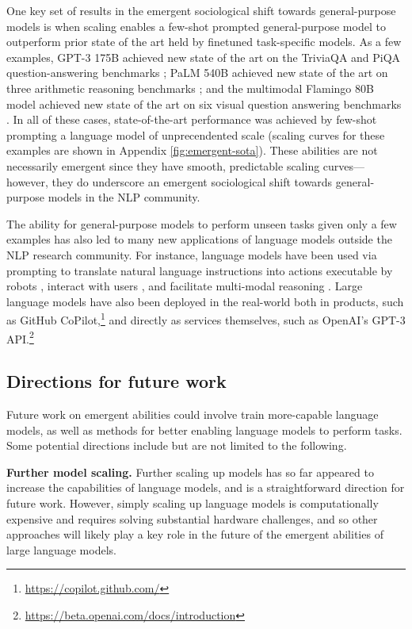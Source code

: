 \documentclass[10pt]{article} %
\begin{document}
One key set of results in the emergent sociological shift towards general-purpose models is when scaling enables a few-shot prompted general-purpose model to outperform prior state of the art held by finetuned task-specific models.
As a few examples, GPT-3 175B achieved new state of the art on the TriviaQA and PiQA question-answering benchmarks \citep{brown2020language}; PaLM 540B achieved new state of the art on three arithmetic reasoning benchmarks \citep{chowdhery2022palm}; and the multimodal Flamingo 80B model achieved new state of the art on six visual question answering benchmarks \citep{alayrac2022flamingo}.
In all of these cases, state-of-the-art performance was achieved by few-shot prompting a language model of unprecendented scale (scaling curves for these examples are shown in Appendix \cref{fig:emergent-sota}).
These abilities are not necessarily emergent since they have smooth, predictable scaling curves---however, they do underscore an emergent sociological shift towards general-purpose models in the NLP community.

The ability for general-purpose models to perform unseen tasks given only a few examples has also led to many new applications of language models outside the NLP research community.
For instance, language models have been used via prompting to translate natural language instructions into actions executable by robots \citep{ahn2022can,huang2022language}, interact with users \citep{coenen2021wordcraft,wu2021ai,wu2022promptchainer,lee2022coauthor}, and facilitate multi-modal reasoning \citep{zeng2022socratic,alayrac2022flamingo}.
Large language models have also been deployed in the real-world both in products, such as GitHub CoPilot,\footnote{\scriptsize \url{https://copilot.github.com/}} and directly as services themselves, such as OpenAI's GPT-3 API.\footnote{\scriptsize \url{https://beta.openai.com/docs/introduction}}


\subsection{Directions for future work}

Future work on emergent abilities could involve train more-capable language models, as well as methods for better enabling language models to perform tasks. 
Some potential directions include but are not limited to the following.

\vspace{1mm}
\noindent
\textbf{Further model scaling.}
Further scaling up models has so far appeared to increase the capabilities of language models, and is a straightforward direction for future work.
However, simply scaling up language models is computationally expensive and requires solving substantial hardware challenges, and so other approaches will likely play a key role in the future of the emergent abilities of large language models.
\end{document}
